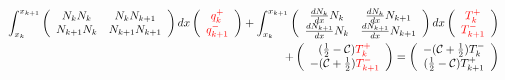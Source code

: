\begin{itemize}
\begin{eqnarray}
&& \int_{x_k}^{x_{k+1}} 
\left(
\begin{array}{cc}
N_k N_k     & N_k N_{k+1} \\
N_{k+1} N_k & N_{k+1} N_{k+1}
\end{array}
\right)dx
\left(
\begin{array}{c}
    {\color{red}q_k^+}  \\
    {\color{red}q_{k+1}^-}
\end{array}
\right)+
\int_{x_k}^{x_{k+1}} 
\left(
\begin{array}{cc}
\frac{dN_k}{dx} N_k     & \frac{dN_k}{dx} N_{k+1} \\
\frac{dN_{k+1}}{dx} N_k & \frac{dN_{k+1}}{dx} N_{k+1}
\end{array}
\right)dx
\left(
\begin{array}{c}
 {\color{red}T_k^+}  \\
{\color{red}T_{k+1}^-} 
\end{array}
\right) \nonumber \\
&&\qquad+ \left(
\begin{array}{c}
     (\frac{1}{2}-{\cal C}) {\color{red}T_k^+}  \\
     -({\cal C}+\frac{1}{2}){\color{red}T_{k+1}^-} 
\end{array}
\right)
= \left(
\begin{array}{c}
     -({\cal C}+\frac{1}{2})  T_k^- \\
     (\frac{1}{2}-{\cal C})  T_{k+1}^+ 
\end{array}
\right) 
\label{eq:dgT1}
\end{eqnarray}





\end{itemize}


